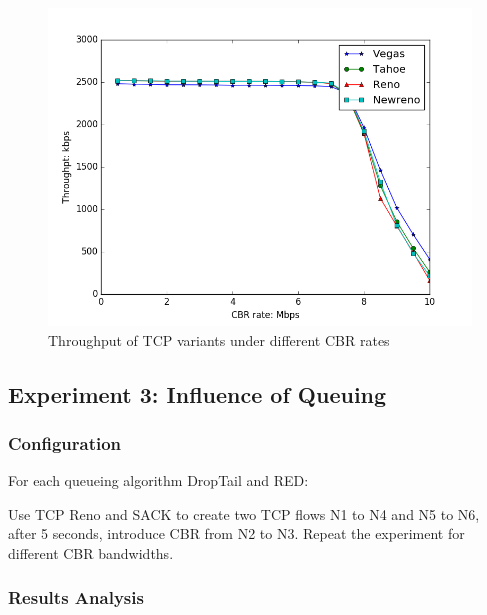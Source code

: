 \documentclass[10pt, conference]{IEEEtran/IEEEtran}
\begin{document}
\begin{figure}[htbp]
\begin{center}
\includegraphics[width=\linewidth]{../exp1/exp1_thpt.png}
\caption{Throughput of TCP variants under different CBR rates}
\label{exp1_thpt}
\end{center}
\end{figure}




\subsection{Experiment 3: Influence of Queuing}

\subsubsection{Configuration}

For each queueing algorithm DropTail and RED:

Use TCP Reno and SACK to create two TCP flows N1 to N4 and N5 to N6, after 5 
seconds, introduce CBR from N2 to N3. Repeat the experiment for different CBR 
bandwidths.

\subsubsection{Results Analysis}
\end{document}
